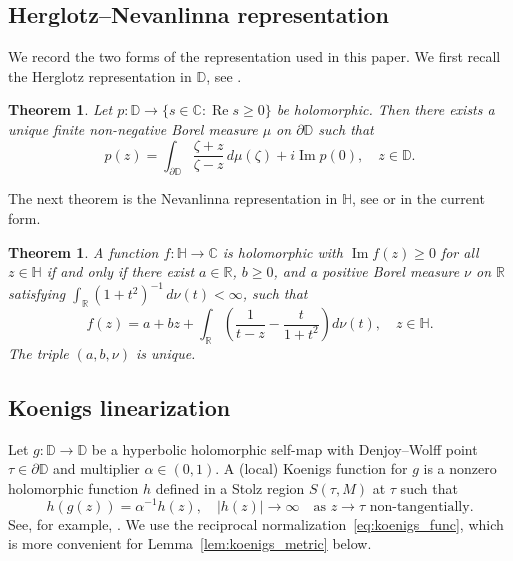 \documentclass[12pt]{amsart}
\numberwithin{equation}{section}
\theoremstyle{plain}
\newtheorem{theorem}[equation]{Theorem}
\theoremstyle{definition}
\begin{document}
\subsection{Herglotz--Nevanlinna representation}
\label{subsec:herglotz}

We record the two forms of the representation used in
this paper. We first recall the Herglotz representation in $\mathbb{D}$, see
{\cite[Theorem~2.1.1]{bracci2020}}.

\begin{theorem}
\label{thm:herglotz_disk}
Let $p:\mathbb{D}\to\{s\in\mathbb{C}:\operatorname{Re}s\ge 0\}$
be holomorphic.
Then there exists a unique finite non-negative Borel measure
$\mu$ on $\partial\mathbb{D}$ such that
\begin{equation*}
p(z)
=\int_{\partial\mathbb{D}}\frac{\zeta+z}{\zeta-z}\,d\mu(\zeta)
 +i\operatorname{Im}p(0),
\quad z\in\mathbb{D}.
\end{equation*}
\end{theorem}

The next theorem is the Nevanlinna representation in $\mathbb{H}$, see
{\cite{Nev} or \cite{Cau} in the current form}.
\begin{theorem}
\label{thm:nevanlinna}
A function $f:\mathbb{H}\to\mathbb{C}$ is holomorphic with
$\operatorname{Im}f(z)\ge 0$ for all $z\in\mathbb{H}$
if and only if there exist $a\in\mathbb{R}$, $b\ge 0$,
and a positive Borel measure $\nu$ on $\mathbb{R}$
satisfying $\int_{\mathbb{R}}(1+t^2)^{-1}\,d\nu(t)<\infty$,
such that
\begin{equation}
\label{eq:nevanlinna_rep}
f(z)
=a+bz
+\int_{\mathbb{R}}
  \left(\frac{1}{t-z}-\frac{t}{1+t^2}\right)d\nu(t),
\quad z\in\mathbb{H}.
\end{equation}
The triple $(a,b,\nu)$ is unique.
\end{theorem}

\subsection{Koenigs linearization}
\label{subsec:koenigs}

Let $g:\mathbb{D}\to\mathbb{D}$ be a hyperbolic holomorphic self-map with
Denjoy--Wolff point $\tau\in\partial\mathbb{D}$ and
multiplier $\alpha\in(0,1)$.
A (local) Koenigs function for $g$ is a nonzero holomorphic
function $h$ defined in a Stolz region $S(\tau,M)$ at $\tau$ such that
\begin{equation}
\label{eq:koenigs_func}
h(g(z))=\alpha^{-1}h(z),
\quad
|h(z)|\to\infty
\quad\text{as } z\to\tau
\text{ non-tangentially}.
\end{equation}
See, for example, \cite[p.~271, Notes~9.9]{bracci2020}. We use the reciprocal
normalization~\eqref{eq:koenigs_func}, which is more convenient for
Lemma~\ref{lem:koenigs_metric} below.
\end{document}
